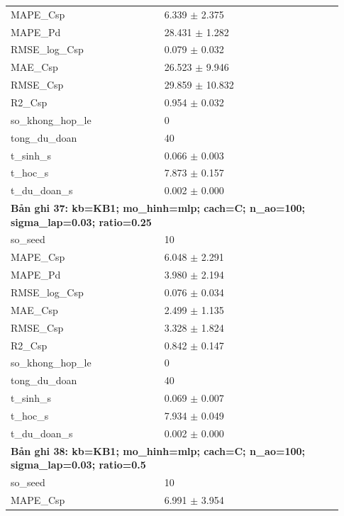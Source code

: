 \begin{longtable}{p{0.43\linewidth}p{0.50\linewidth}}
MAPE\_\allowbreak Csp & 6.339 $\pm$ 2.375 \\
MAPE\_\allowbreak Pd & 28.431 $\pm$ 1.282 \\
RMSE\_\allowbreak log\_\allowbreak Csp & 0.079 $\pm$ 0.032 \\
MAE\_\allowbreak Csp & 26.523 $\pm$ 9.946 \\
RMSE\_\allowbreak Csp & 29.859 $\pm$ 10.832 \\
R2\_\allowbreak Csp & 0.954 $\pm$ 0.032 \\
so\_\allowbreak khong\_\allowbreak hop\_\allowbreak le & 0 \\
tong\_\allowbreak du\_\allowbreak doan & 40 \\
t\_\allowbreak sinh\_\allowbreak s & 0.066 $\pm$ 0.003 \\
t\_\allowbreak hoc\_\allowbreak s & 7.873 $\pm$ 0.157 \\
t\_\allowbreak du\_\allowbreak doan\_\allowbreak s & 0.002 $\pm$ 0.000 \\
\midrule
\multicolumn{2}{p{0.95\linewidth}}{\textbf{Bản ghi 37: kb=KB1; mo\_hinh=mlp; cach=C; n\_ao=100; sigma\_lap=0.03; ratio=0.25}} \\
so\_\allowbreak seed & 10 \\
MAPE\_\allowbreak Csp & 6.048 $\pm$ 2.291 \\
MAPE\_\allowbreak Pd & 3.980 $\pm$ 2.194 \\
RMSE\_\allowbreak log\_\allowbreak Csp & 0.076 $\pm$ 0.034 \\
MAE\_\allowbreak Csp & 2.499 $\pm$ 1.135 \\
RMSE\_\allowbreak Csp & 3.328 $\pm$ 1.824 \\
R2\_\allowbreak Csp & 0.842 $\pm$ 0.147 \\
so\_\allowbreak khong\_\allowbreak hop\_\allowbreak le & 0 \\
tong\_\allowbreak du\_\allowbreak doan & 40 \\
t\_\allowbreak sinh\_\allowbreak s & 0.069 $\pm$ 0.007 \\
t\_\allowbreak hoc\_\allowbreak s & 7.934 $\pm$ 0.049 \\
t\_\allowbreak du\_\allowbreak doan\_\allowbreak s & 0.002 $\pm$ 0.000 \\
\midrule
\multicolumn{2}{p{0.95\linewidth}}{\textbf{Bản ghi 38: kb=KB1; mo\_hinh=mlp; cach=C; n\_ao=100; sigma\_lap=0.03; ratio=0.5}} \\
so\_\allowbreak seed & 10 \\
MAPE\_\allowbreak Csp & 6.991 $\pm$ 3.954 \\

\end{longtable}
